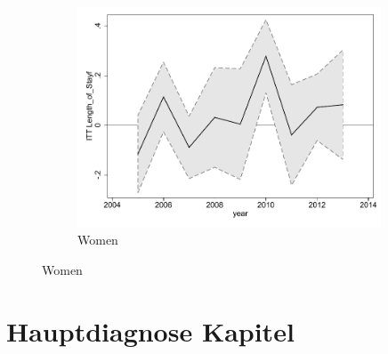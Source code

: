 \documentclass[a4paper ]{article}
\begin{document}
\begin{figure}[h!]
\begin{subfigure}[t]{0.31\textwidth}
		\includegraphics[width=0.99\textwidth]{R1_LC_Length_of_Stayf}
		\caption{Women}
	\end{subfigure}
\end{figure}

%
\newpage
\section{Hauptdiagnose Kapitel}
\end{document}
